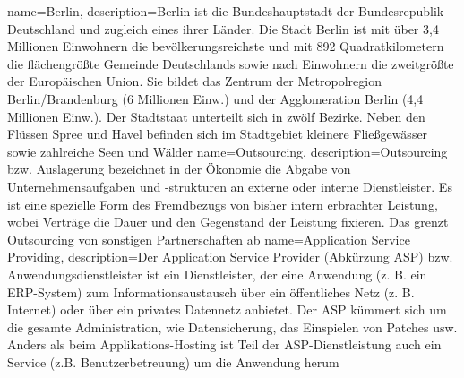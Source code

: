      {
        name={Berlin},
        description={Berlin ist die Bundeshauptstadt der Bundesrepublik Deutschland und zugleich eines ihrer Länder. Die Stadt Berlin ist mit über 3,4 Millionen Einwohnern die bevölkerungsreichste und mit 892 Quadratkilometern die flächengrößte Gemeinde Deutschlands sowie nach Einwohnern die zweitgrößte der Europäischen Union. Sie bildet das Zentrum der Metropolregion Berlin/Brandenburg (6 Millionen Einw.) und der Agglomeration Berlin (4,4 Millionen Einw.). Der Stadtstaat unterteilt sich in zwölf Bezirke. Neben den Flüssen Spree und Havel befinden sich im Stadtgebiet kleinere Fließgewässer sowie zahlreiche Seen und Wälder}
        }
     {
        name={Outsourcing},
        description={Outsourcing bzw. Auslagerung bezeichnet in der Ökonomie die Abgabe von Unternehmensaufgaben und -strukturen an externe oder interne Dienstleister. Es ist eine spezielle Form des Fremdbezugs von bisher intern erbrachter Leistung, wobei Verträge die Dauer und den Gegenstand der Leistung fixieren. Das grenzt Outsourcing von sonstigen Partnerschaften ab}
        }
     {
        name={Application Service Providing},
        description={Der Application Service Provider (Abkürzung ASP) bzw. Anwendungsdienstleister ist ein Dienstleister, der eine Anwendung (z. B. ein ERP-System) zum Informationsaustausch über ein öffentliches Netz (z. B. Internet) oder über ein privates Datennetz anbietet. Der ASP kümmert sich um die gesamte Administration, wie Datensicherung, das Einspielen von Patches usw. Anders als beim Applikations-Hosting ist Teil der ASP-Dienstleistung auch ein Service (z.B. Benutzerbetreuung) um die Anwendung herum}
        }
